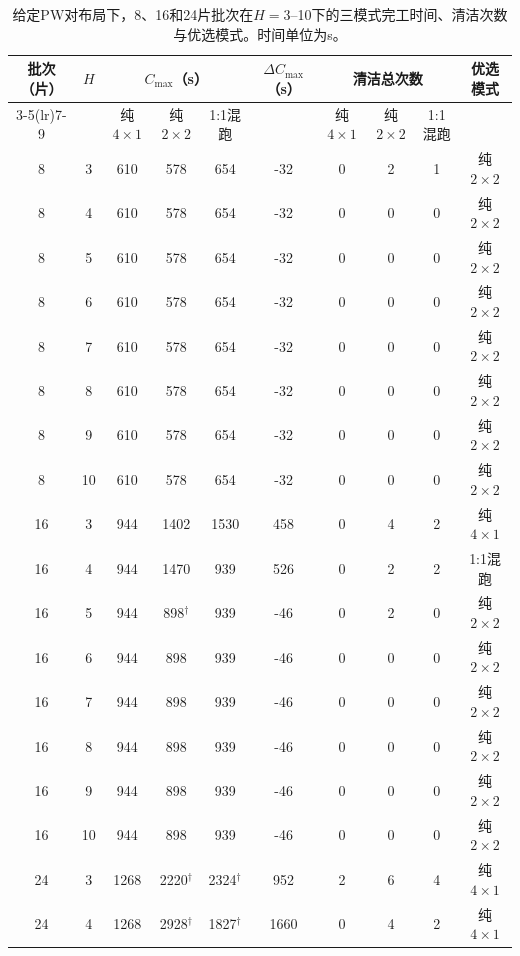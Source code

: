 \documentclass[final,5p,times,twocolumn]{elsarticle}
\begin{document}
\begin{table}[tp]
\centering
\scriptsize
\setlength{\tabcolsep}{3pt}
\caption{给定PW对布局下，8、16和24片批次在$H=3$--10下的三模式完工时间、清洁次数与优选模式。时间单位为s。}
\label{tab:clean-crossover-zh}
\begin{tabular}{cccccccccc}
\toprule
\multirow{2}{*}{批次（片）} & \multirow{2}{*}{$H$} & \multicolumn{3}{c}{$C_{\max}$（s）} & \multirow{2}{*}{$\Delta C_{\max}$（s）} & \multicolumn{3}{c}{清洁总次数} & \multirow{2}{*}{优选模式}\\
\cmidrule(lr){3-5}\cmidrule(lr){7-9}
 & & 纯$4\times1$ & 纯$2\times2$ & 1:1混跑 & & 纯$4\times1$ & 纯$2\times2$ & 1:1混跑 & \\
\midrule
8 & 3 & 610 & 578 & 654 & -32 & 0 & 2 & 1 & 纯$2\times2$\\
8 & 4 & 610 & 578 & 654 & -32 & 0 & 0 & 0 & 纯$2\times2$\\
8 & 5 & 610 & 578 & 654 & -32 & 0 & 0 & 0 & 纯$2\times2$\\
8 & 6 & 610 & 578 & 654 & -32 & 0 & 0 & 0 & 纯$2\times2$\\
8 & 7 & 610 & 578 & 654 & -32 & 0 & 0 & 0 & 纯$2\times2$\\
8 & 8 & 610 & 578 & 654 & -32 & 0 & 0 & 0 & 纯$2\times2$\\
8 & 9 & 610 & 578 & 654 & -32 & 0 & 0 & 0 & 纯$2\times2$\\
8 & 10 & 610 & 578 & 654 & -32 & 0 & 0 & 0 & 纯$2\times2$\\
\midrule
16 & 3 & 944 & 1402 & 1530 & 458 & 0 & 4 & 2 & 纯$4\times1$\\
16 & 4 & 944 & 1470 & 939 & 526 & 0 & 2 & 2 & 1:1混跑\\
16 & 5 & 944 & 898$^{\dagger}$ & 939 & -46 & 0 & 2 & 0 & 纯$2\times2$\\
16 & 6 & 944 & 898 & 939 & -46 & 0 & 0 & 0 & 纯$2\times2$\\
16 & 7 & 944 & 898 & 939 & -46 & 0 & 0 & 0 & 纯$2\times2$\\
16 & 8 & 944 & 898 & 939 & -46 & 0 & 0 & 0 & 纯$2\times2$\\
16 & 9 & 944 & 898 & 939 & -46 & 0 & 0 & 0 & 纯$2\times2$\\
16 & 10 & 944 & 898 & 939 & -46 & 0 & 0 & 0 & 纯$2\times2$\\
\midrule
24 & 3 & 1268 & 2220$^{\dagger}$ & 2324$^{\dagger}$ & 952 & 2 & 6 & 4 & 纯$4\times1$\\
24 & 4 & 1268 & 2928$^{\dagger}$ & 1827$^{\dagger}$ & 1660 & 0 & 4 & 2 & 纯$4\times1$\\

\end{tabular}
\end{table}
\end{document}
